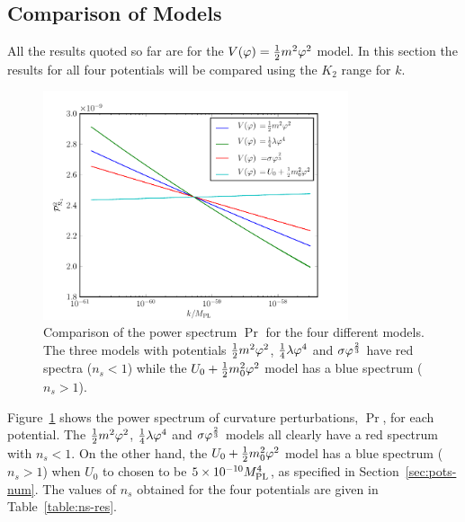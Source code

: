 \subsection{Comparison of Models}
\label{sec:compare-res}
All the results quoted so far are for the $V(\varphi)=\frac{1}{2} m^2 \varphi^2$ model. In this section
the results for all four potentials will be compared using the $K_2$ range for $k$. 
% 
% 
\begin{figure}[htbp]
 \centering
\includegraphics[width=0.8\textwidth]{numerical/graphs/cmp_Pr_allks-large}
\caption[Comparison of $\Pr$ for models]{Comparison of the power spectrum $\Pr$ for
the four different models. The three models with potentials $\frac{1}{2} m^2 \varphi^2$,
$\frac{1}{4}\lambda\varphi^4$ and
$\sigma\varphi^{\frac{2}{3}}$ have red spectra ($n_s <1$) while the $U_0 + \frac{1}{2} m_0^2 \varphi^2$
model has a blue spectrum ($n_s>1$).}
\label{fig:cmp-Pr}
\end{figure}
% 
Figure~\ref{fig:cmp-Pr} shows the power spectrum of curvature perturbations, $\Pr$, for each
potential. The $\frac{1}{2} m^2 \varphi^2$, $\frac{1}{4}\lambda\varphi^4$ and $\sigma\varphi^{\frac{2}{3}}$ models all
clearly have
a red spectrum with $n_s <1$. On the other hand, the $U_0 + \frac{1}{2} m_0^2 \varphi^2$ model has
a blue
spectrum ($n_s>1$) when $U_0$ to chosen to be $5\times 10^{-10}M_{\mathrm{PL}}^4$, as specified in
Section~\ref{sec:pots-num}. 
% 
The values of $n_s$ obtained for the four potentials are given in Table~\ref{table:ns-res}. 
% 
